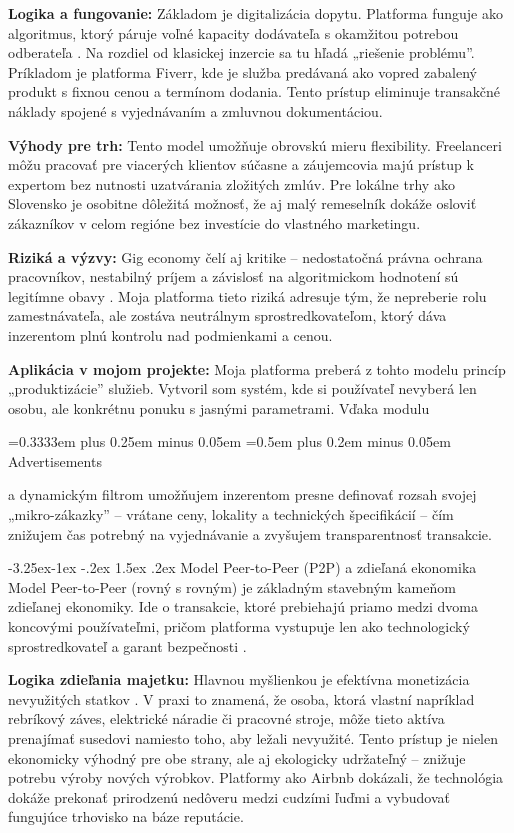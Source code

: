 \documentclass[12pt]{article}
\makeatletter
\newcommand{\hlcode}[1]{%
  \allowbreak
  \begingroup
  \setlength{\fboxsep}{2.4pt}%
  \setlength{\fboxrule}{0pt}%
  \colorbox{gray!15}{%
    \strut
    {\ttfamily\small
     \hyphenpenalty=10000
     \exhyphenpenalty=10000
     \spaceskip=0.3333em plus 0.25em minus 0.05em
     \xspaceskip=0.5em plus 0.2em minus 0.05em
     #1}%
  }%
  \endgroup
  \allowbreak
}
\renewcommand{\subsubsection}{\@startsection{subsubsection}{3}{\z@}%
  {-3.25ex\@plus -1ex \@minus -.2ex}%
  {1.5ex \@plus .2ex}%
  {\normalfont\large\bfseries}}
\makeatother
\begin{document}
\textbf{Logika a fungovanie:} Základom je digitalizácia dopytu. Platforma funguje ako algoritmus, ktorý páruje voľné kapacity dodávateľa s okamžitou potrebou odberateľa \parencite{rochet2003platform}. Na rozdiel od klasickej inzercie sa tu hľadá „riešenie problému”. Príkladom je platforma Fiverr, kde je služba predávaná ako vopred zabalený produkt s fixnou cenou a termínom dodania. Tento prístup eliminuje transakčné náklady spojené s vyjednávaním a zmluvnou dokumentáciou.

\textbf{Výhody pre trh:} Tento model umožňuje obrovskú mieru flexibility. Freelanceri môžu pracovať pre viacerých klientov súčasne a záujemcovia majú prístup k expertom bez nutnosti uzatvárania zložitých zmlúv. Pre lokálne trhy ako Slovensko je osobitne dôležitá možnosť, že aj malý remeselník dokáže osloviť zákazníkov v celom regióne bez investície do vlastného marketingu.

\textbf{Riziká a výzvy:} Gig economy čelí aj kritike -- nedostatočná právna ochrana pracovníkov, nestabilný príjem a závislosť na algoritmickom hodnotení sú legitímne obavy \parencite{vallas2020platforms}. Moja platforma tieto riziká adresuje tým, že nepreberie rolu zamestnávateľa, ale zostáva neutrálnym sprostredkovateľom, ktorý dáva inzerentom plnú kontrolu nad podmienkami a cenou.

\textbf{Aplikácia v mojom projekte:} Moja platforma preberá z tohto modelu princíp „produktizácie” služieb. Vytvoril som systém, kde si používateľ nevyberá len osobu, ale konkrétnu ponuku s jasnými parametrami. Vďaka modulu \hlcode{Advertisements} a dynamickým filtrom umožňujem inzerentom presne definovať rozsah svojej „mikro-zákazky” -- vrátane ceny, lokality a technických špecifikácií -- čím znižujem čas potrebný na vyjednávanie a zvyšujem transparentnosť transakcie.

\subsubsection{Model Peer-to-Peer (P2P) a zdieľaná ekonomika}
Model Peer-to-Peer (rovný s rovným) je základným stavebným kameňom zdieľanej ekonomiky. Ide o transakcie, ktoré prebiehajú priamo medzi dvoma koncovými používateľmi, pričom platforma vystupuje len ako technologický sprostredkovateľ a garant bezpečnosti \parencite{sundararajan2014peer}.

\textbf{Logika zdieľania majetku:} Hlavnou myšlienkou je efektívna monetizácia nevyužitých statkov \parencite{sundararajan2014peer}. V praxi to znamená, že osoba, ktorá vlastní napríklad rebríkový záves, elektrické náradie či pracovné stroje, môže tieto aktíva prenajímať susedovi namiesto toho, aby ležali nevyužité. Tento prístup je nielen ekonomicky výhodný pre obe strany, ale aj ekologicky udržateľný -- znižuje potrebu výroby nových výrobkov. Platformy ako Airbnb dokázali, že technológia dokáže prekonať prirodzenú nedôveru medzi cudzími ľuďmi a vybudovať fungujúce trhovisko na báze reputácie.
\end{document}
